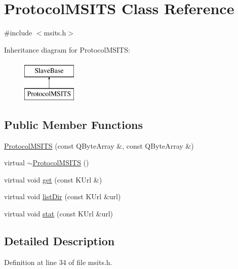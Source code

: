 \hypertarget{classProtocolMSITS}{\section{Protocol\+M\+S\+I\+T\+S Class Reference}
\label{classProtocolMSITS}
}


{\ttfamily \#include $<$msits.\+h$>$}

Inheritance diagram for Protocol\+M\+S\+I\+T\+S\+:\begin{figure}[H]
\begin{center}
\leavevmode
\includegraphics[height=2.000000cm]{classProtocolMSITS}
\end{center}
\end{figure}
\subsection*{Public Member Functions}
\begin{DoxyCompactItemize}
\item 
\hyperlink{classProtocolMSITS_ab517eb94fd0a18fa5a24c8e5db8de42d}{Protocol\+M\+S\+I\+T\+S} (const Q\+Byte\+Array \&, const Q\+Byte\+Array \&)
\item 
virtual \hyperlink{classProtocolMSITS_a3c88db8977ae64cd16b0d94bfcb10dea}{$\sim$\+Protocol\+M\+S\+I\+T\+S} ()
\item 
virtual void \hyperlink{classProtocolMSITS_af629190845c5bd05e0c0ca4454d1fd9e}{get} (const K\+Url \&)
\item 
virtual void \hyperlink{classProtocolMSITS_a2cfbc932826f598d0e32298993d8c37d}{list\+Dir} (const K\+Url \&url)
\item 
virtual void \hyperlink{classProtocolMSITS_a33676111f283f65b4f01cc9b468b5234}{stat} (const K\+Url \&url)
\end{DoxyCompactItemize}


\subsection{Detailed Description}


Definition at line 34 of file msits.\+h.



